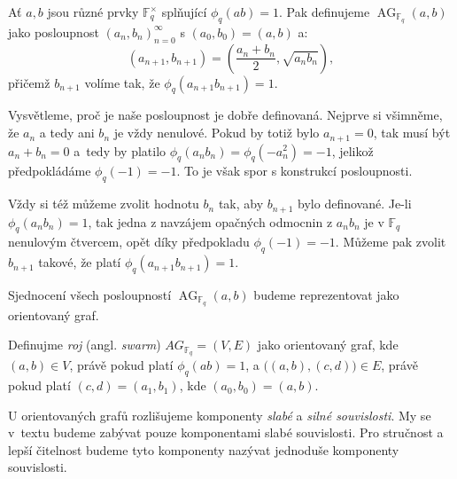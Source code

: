 \documentclass[12pt]{report}
\DeclareMathOperator{\AG}{AG}
\begin{document}
\begin{definice}
Ať $a,b$ jsou různé prvky $\mathbb{F}_q ^{\times}$ splňující $\phi_q (ab) = 1$. Pak definujeme $\AG_{\mathbb{F}_q}(a,b)$ jako posloupnost $(a_n,b_n)_{n=0}^{\infty}$ s $(a_0,b_0) = (a,b)$ a:
\begin{equation*}
\left(a_{n+1},b_{n+1} \right) = \left(\frac{a_n+b_n}{2}, \sqrt{a_n b_n} \right),
\end{equation*}
přičemž $b_{n+1}$ volíme tak, že $\phi_q (a_{n+1} b_{n+1}) = 1$.
\end{definice}
Vysvětleme, proč je naše posloupnost je dobře definovaná. Nejprve si všimněme, že $a_n$ a tedy ani $b_n$ je vždy nenulové. Pokud by totiž bylo $a_{n+1} = 0$, tak musí být $a_{n}+b_n = 0$ a~tedy by platilo $\phi_q (a_n b_n) = \phi_q (- a_n ^2) = -1$, jelikož předpokládáme $\phi_q(-1)=-1$. To je však spor s konstrukcí posloupnosti.

Vždy si též můžeme zvolit hodnotu $b_n$ tak, aby $b_{n+1}$ bylo definované. Je-li $\phi_q (a_n b_n) = 1$, tak jedna z navzájem opačných odmocnin z $a_n b_n$ je v $\mathbb{F}_q$ nenulovým čtvercem, opět díky předpokladu $\phi_q(-1) = -1$. Můžeme pak zvolit $b_{n+1}$ takové, že platí $\phi_q (a_{n+1} b_{n+1}) = 1$.


Sjednocení všech posloupností $\AG_{\mathbb{F}_q}(a,b)$ budeme reprezentovat jako orientovaný graf.
\begin{definice}
Definujme \textit{roj} (angl. \textit{swarm}) $AG_{\mathbb{F}_q} = (V,E)$ jako orientovaný graf, kde $(a,b) \in V$, právě pokud platí $\phi_q(ab) = 1$, a $\big((a,b),(c,d)\big) \in E$, právě pokud platí $(c,d) = (a_1,b_1)$, kde $(a_0,b_0) = (a,b)$.
\end{definice}

\begin{umluva}
U orientovaných grafů rozlišujeme komponenty \textit{slabé} a \textit{silné souvislosti}. My se v~textu budeme zabývat pouze komponentami slabé souvislosti. Pro stručnost a lepší čitelnost budeme tyto komponenty nazývat jednoduše komponenty souvislosti.
\end{umluva}
\end{document}
